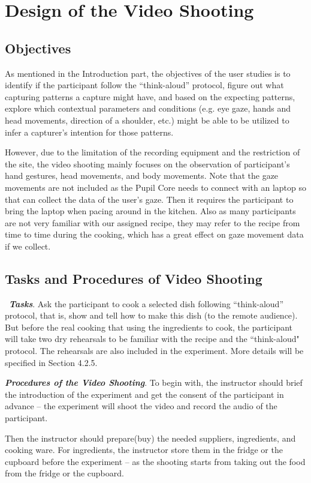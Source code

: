 \documentclass[fyp]{socreport}
\begin{document}
\section{Design of the Video Shooting}
\subsection{Objectives}
As mentioned in the Introduction part, the objectives of the user studies is to identify if the participant follow the ``think-aloud” protocol, figure out what capturing patterns a capture might have, and based on the expecting patterns, explore which contextual parameters and conditions (e.g. eye gaze, hands and head movements, direction of a shoulder, etc.) might be able to be utilized to infer a capturer’s intention for those patterns.

However, due to the limitation of the recording equipment and the restriction of the site, the video shooting mainly focuses on the observation of participant's hand gestures, head movements, and body movements. Note that the gaze movements are not included as the Pupil Core needs to connect with an laptop so that can collect the data of the user's gaze. Then it requires the participant to bring the laptop when pacing around in the kitchen. Also as many participants are not very familiar with our assigned recipe, they may refer to the recipe from time to time during the cooking, which has a great effect on gaze movement data if we collect.

\subsection{Tasks and Procedures of Video Shooting}
\quad\, \textbf{\textit{Tasks}}. Ask the participant to cook a selected dish following  ``think-aloud” protocol, that is, show and tell how to make this dish (to the remote audience). But before the real cooking that using the ingredients to cook, the participant will take two dry rehearsals to be familiar with the recipe and the ``think-aloud" protocol. The rehearsals are also included in the experiment. More details will be specified in Section 4.2.5.

\textbf{\textit{Procedures of the Video Shooting}}. To begin with, the instructor should brief the introduction of the experiment and get the consent of the participant in advance -- the experiment will shoot the video and record the audio of the participant.

Then the instructor should prepare(buy) the needed suppliers, ingredients, and cooking ware. For ingredients, the instructor store them in the fridge or the cupboard before the experiment -- as the shooting starts from taking out the food from the fridge or the cupboard. 
\end{document}
